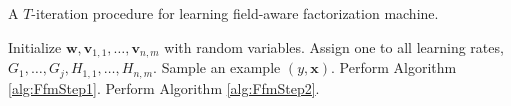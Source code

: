 \documentclass[11pt]{article}
\newcommand{\bsym}[1]{\ensuremath{\boldsymbol{#1}}}
\newcommand{\bw}{\ensuremath{\bsym{w}}}
\newcommand{\bv}{\ensuremath{\bsym{v}}}
\newcommand{\bx}{\ensuremath{\bsym{x}}}
\begin{document}
\begin{algorithm}
    \label{alg:Main}
    \caption{A $T$-iteration procedure for learning field-aware factorization machine.}
    \begin{algorithmic}[1]
        \State Initialize $\bw,\bv_{1,1},\dots,\bv_{n,m}$ with random variables.
        \State Assign one to all learning rates, $G_1,\dots,G_j,H_{1,1},\dots,H_{n,m}$.
            \State Sample an example $(y, \bx)$.
            \State Perform Algorithm \ref{alg:FfmStep1}.
            \State Perform Algorithm \ref{alg:FfmStep2}.
        \EndFor
    \end{algorithmic}
\end{algorithm}
\end{document}
